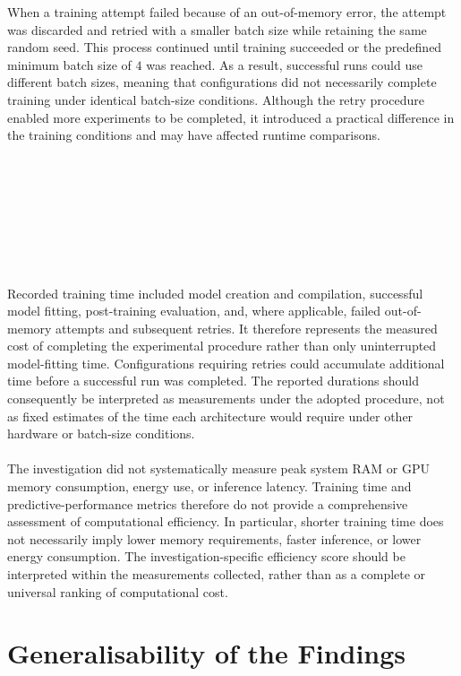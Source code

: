 \documentclass[12pt, a4paper]{report}
\let\oldsection\section
\renewcommand{\section}{%
    \Needspace{6\baselineskip}%
    \oldsection
}
\begin{document}
				When a training attempt failed because of an out-of-memory error, the attempt was discarded and retried with a smaller batch size while retaining the same random seed. This process continued until training succeeded or the predefined minimum batch size of $4$ was reached. As a result, successful runs could use different batch sizes, meaning that configurations did not necessarily complete training under identical batch-size conditions. Although the retry procedure enabled more experiments to be completed, it introduced a practical difference in the training conditions and may have affected runtime comparisons.\\\\\\\\\\\\\\\\\\
				Recorded training time included model creation and compilation, successful model fitting, post-training evaluation, and, where applicable, failed out-of-memory attempts and subsequent retries. It therefore represents the measured cost of completing the experimental procedure rather than only uninterrupted model-fitting time. Configurations requiring retries could accumulate additional time before a successful run was completed. The reported durations should consequently be interpreted as measurements under the adopted procedure, not as fixed estimates of the time each architecture would require under other hardware or batch-size conditions.\\\\
				The investigation did not systematically measure peak system RAM or GPU memory consumption, energy use, or inference latency. Training time and predictive-performance metrics therefore do not provide a comprehensive assessment of computational efficiency. In particular, shorter training time does not necessarily imply lower memory requirements, faster inference, or lower energy consumption. The investigation-specific efficiency score should be interpreted within the measurements collected, rather than as a complete or universal ranking of computational cost.
				
		\section{Generalisability of the Findings}
			
\end{document}
